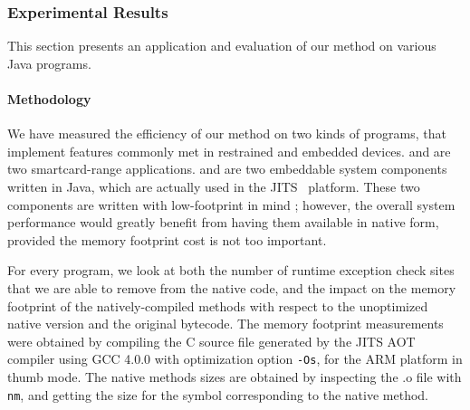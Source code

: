 \subsubsection{Experimental Results}
\label{sec:experiments}

This section presents an application and evaluation of our method on various Java programs.

\paragraph{Methodology}

We have measured the efficiency of our method on two kinds of programs, that implement features commonly met in restrained and embedded devices.  and  are two smartcard-range applications.
 and  are two embeddable system components written in Java, which are actually used in the JITS~\cite{JITSWebsite} platform.
These two components are written with low-footprint in mind ; however, the overall system performance would greatly benefit from having them available in native form, provided the memory footprint cost is not too important.

For every program, we look at both the number of runtime exception check sites that we are able to remove from the native code, and the impact on the memory footprint of the natively-compiled methods with respect to the unoptimized native version and the original bytecode. The memory footprint measurements were obtained by compiling the C source file generated by the JITS AOT compiler using GCC 4.0.0 with optimization option \texttt{-Os}, for the ARM platform in thumb mode. The native methods sizes are obtained by inspecting the .o file with \texttt{nm}, and getting the size for the symbol corresponding to the native method.

